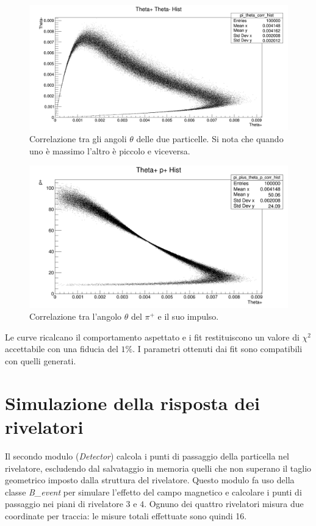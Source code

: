 \documentclass[8pt]{extarticle}
\begin{document}
\begin{figure}
	\begin{center}
		\includegraphics[scale=0.3]{gen_thetatheta} 
		\caption{Correlazione tra gli angoli $\theta$ delle due particelle. Si nota che quando uno è massimo l'altro è piccolo e viceversa.}
		\label{fig:gen_thetatheta}
	\end{center}
\end{figure}

\begin{figure}
	\begin{center}
		\includegraphics[scale=0.3]{gen_thetap} 
		\caption{Correlazione tra l'angolo $\theta$ del $\pi^+$ e il suo impulso.}
		\label{fig:gen_thetap}
	\end{center}
\end{figure}

Le curve ricalcano il comportamento aspettato e i fit restituiscono un valore di $\chi^2$ accettabile con una fiducia del $1\%$. I parametri ottenuti dai fit sono compatibili con quelli generati.

\section{Simulazione della risposta dei rivelatori} \label{sec:detector}
Il secondo modulo (\textit{Detector}) calcola i punti di passaggio della particella nel rivelatore, escludendo dal salvataggio in memoria quelli che non superano il taglio geometrico imposto dalla struttura del rivelatore. Questo modulo fa uso della classe \textit{B\_event} per simulare l'effetto del campo magnetico e calcolare i punti di passaggio nei piani di rivelatore $3$ e $4$. Ognuno dei quattro rivelatori misura due coordinate per traccia: le misure totali effettuate sono quindi 16.
\end{document}

